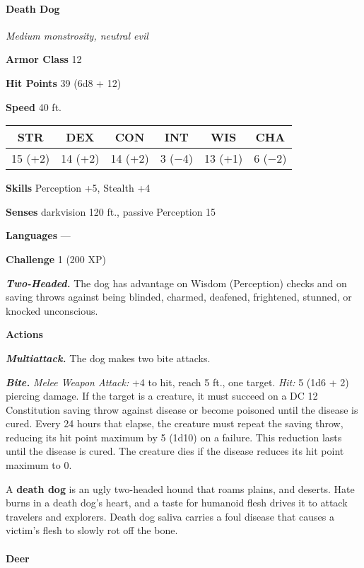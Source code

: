 \documentclass[
]{article}
\begin{document}
\hypertarget{death-dog}{%
\paragraph{Death Dog}\label{death-dog}}

\emph{Medium monstrosity, neutral evil}

\textbf{Armor Class} 12

\textbf{Hit Points} 39 (6d8 + 12)

\textbf{Speed} 40 ft.

\begin{longtable}[]{@{}cccccc@{}}
\toprule
STR & DEX & CON & INT & WIS & CHA\tabularnewline
\midrule
\endhead
15 (+2) & 14 (+2) & 14 (+2) & 3 (−4) & 13 (+1) & 6 (−2)\tabularnewline
\bottomrule
\end{longtable}

\textbf{Skills} Perception +5, Stealth +4

\textbf{Senses} darkvision 120 ft., passive Perception 15

\textbf{Languages} ---

\textbf{Challenge} 1 (200 XP)

\emph{\textbf{Two-Headed.}} The dog has advantage on Wisdom (Perception)
checks and on saving throws against being blinded, charmed, deafened,
frightened, stunned, or knocked unconscious.

\textbf{Actions}

\emph{\textbf{Multiattack.}} The dog makes two bite attacks.

\emph{\textbf{Bite.}} \emph{Melee Weapon Attack:} +4 to hit, reach 5
ft., one target. \emph{Hit:} 5 (1d6 + 2) piercing damage. If the target
is a creature, it must succeed on a DC 12 Constitution saving throw
against disease or become poisoned until the disease is cured. Every 24
hours that elapse, the creature must repeat the saving throw, reducing
its hit point maximum by 5 (1d10) on a failure. This reduction lasts
until the disease is cured. The creature dies if the disease reduces its
hit point maximum to 0.

A \textbf{death dog} is an ugly two-headed hound that roams plains, and
deserts. Hate burns in a death dog's heart, and a taste for humanoid
flesh drives it to attack travelers and explorers. Death dog saliva
carries a foul disease that causes a victim's flesh to slowly rot off
the bone.

\hypertarget{deer}{%
\paragraph{Deer}\label{deer}}
\end{document}
